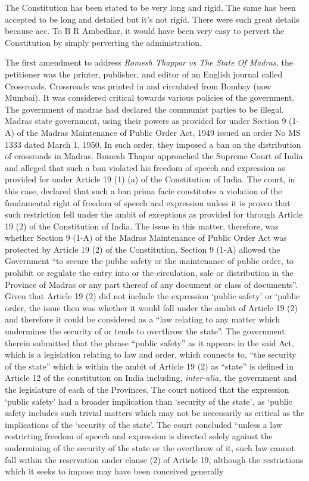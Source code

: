 \begin{multicols}{2}
\noi
The Constitution has been stated to be very long and rigid. The same has been accepted to be long and detailed but it’s not rigid. There were such great details because acc. To B R Ambedkar, it would have been very easy to pervert the Constitution by simply perverting the administration.


\noi
The first amendment to address \textit{Romesh Thappar vs The State Of Madras,} the petitioner was the printer, publisher, and editor of an English journal called Crossroads. Crossroads was printed in and circulated from Bombay (now Mumbai). It was considered critical towards various policies of the government. The government of madras had declared the communist parties to be illegal. Madras state government, using their powers as provided for under Section 9 (1-A) of the Madras Maintenance of Public Order Act, 1949 issued an order No MS 1333 dated March 1, 1950. In such order, they imposed a ban on the distribution of crossroads in Madras. Romesh Thapar approached the Supreme Court of India and alleged that such a ban violated his freedom of speech and expression as provided for under Article 19 (1) (a) of the Constitution of India. The court, in this case, declared that such a ban prima facie constitutes a violation of the fundamental right of freedom of speech and expression unless it is proven that such restriction fell under the ambit of exceptions as provided for through Article 19 (2) of the Constitution of India. The issue in this matter, therefore, was whether Section 9 (1-A) of the Madras Maintenance of Public Order Act was protected by Article 19 (2) of the Constitution. Section 9 (1-A) allowed the Government “to secure the public safety or the maintenance of public order, to prohibit or regulate the entry into or the circulation, sale or distribution in the Province of Madras or any part thereof of any document or class of documents”. Given that Article 19 (2) did not include the expression ‘public safety’ or ‘public order, the issue then was whether it would fall under the ambit of Article 19 (2) and therefore it could be considered as a “law relating to any matter which undermines the security of or tends to overthrow the state”. The government therein submitted that the phrase “public safety” as it appears in the said Act, which is a legislation relating to law and order, which connects to, “the security of the state” which is within the ambit of Article 19 (2) as “state” is defined in Article 12 of the constitution on India including, \textit{inter-alia,} the government and the legislature of each of the Provinces. The court noticed that the expression ‘public safety’ had a broader implication than ‘security of the state’, as ‘public safety includes such trivial matters which may not be necessarily as critical as the implications of the ‘security of the state’. The court concluded “unless a law restricting freedom of speech and expression is directed solely against the undermining of the security of the state or the overthrow of it, such law cannot fall within the reservation under clause (2) of Article 19, although the restrictions which it seeks to impose may have been conceived generally 
\end{multicols}
